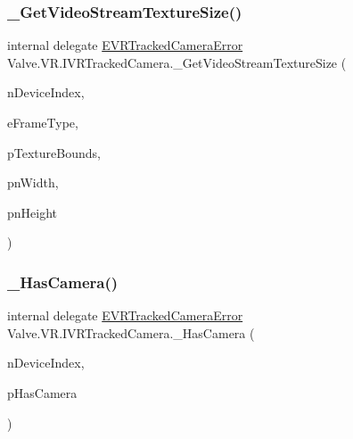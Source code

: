 \mbox{\label{struct_valve_1_1_v_r_1_1_i_v_r_tracked_camera_a8a269f673569d9678c1389d30b523de4}} 
\subsubsection{\texorpdfstring{\_GetVideoStreamTextureSize()}{\_GetVideoStreamTextureSize()}}
{\footnotesize\ttfamily internal delegate \mbox{\hyperlink{namespace_valve_1_1_v_r_ad0e012e846f5d93848783c044614cfd3}{E\+V\+R\+Tracked\+Camera\+Error}} Valve.\+V\+R.\+I\+V\+R\+Tracked\+Camera.\+\_\+\+Get\+Video\+Stream\+Texture\+Size (\begin{DoxyParamCaption}\item[{uint}]{n\+Device\+Index,  }\item[{\mbox{\hyperlink{namespace_valve_1_1_v_r_a9962211bc3fe98c2683db188c12c9afd}{E\+V\+R\+Tracked\+Camera\+Frame\+Type}}}]{e\+Frame\+Type,  }\item[{ref \mbox{\hyperlink{struct_valve_1_1_v_r_1_1_v_r_texture_bounds__t}{V\+R\+Texture\+Bounds\+\_\+t}}}]{p\+Texture\+Bounds,  }\item[{ref uint}]{pn\+Width,  }\item[{ref uint}]{pn\+Height }\end{DoxyParamCaption})}

\mbox{\label{struct_valve_1_1_v_r_1_1_i_v_r_tracked_camera_a4138984fea114155a7a9f4cd9344abcf}} 
\subsubsection{\texorpdfstring{\_HasCamera()}{\_HasCamera()}}
{\footnotesize\ttfamily internal delegate \mbox{\hyperlink{namespace_valve_1_1_v_r_ad0e012e846f5d93848783c044614cfd3}{E\+V\+R\+Tracked\+Camera\+Error}} Valve.\+V\+R.\+I\+V\+R\+Tracked\+Camera.\+\_\+\+Has\+Camera (\begin{DoxyParamCaption}\item[{uint}]{n\+Device\+Index,  }\item[{ref bool}]{p\+Has\+Camera }\end{DoxyParamCaption})}

